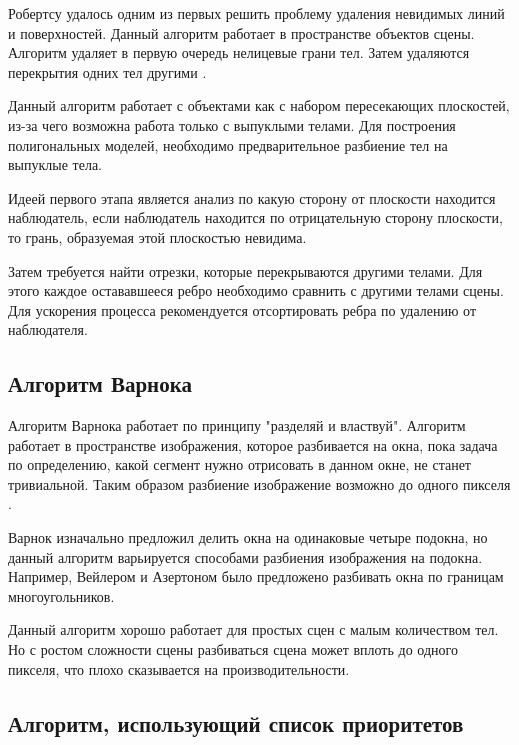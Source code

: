 Робертсу удалось одним из первых решить проблему удаления невидимых линий и поверхностей. Данный алгоритм работает в пространстве объектов сцены. Алгоритм удаляет в первую очередь нелицевые грани тел. Затем удаляются перекрытия одних тел другими  \cite{Rogers89}.

\par
Данный алгоритм работает с объектами как с набором пересекающих плоскостей, из-за чего возможна работа только с выпуклыми телами. Для построения полигональных моделей, необходимо предварительное разбиение тел на выпуклые тела.
\par
Идеей первого этапа является анализ по какую сторону от плоскости находится наблюдатель, если наблюдатель находится по отрицательную сторону плоскости, то грань, образуемая этой плоскостью невидима.
\par
Затем требуется найти отрезки, которые перекрываются другими телами. Для этого каждое остававшееся ребро необходимо сравнить с другими телами сцены. Для ускорения процесса рекомендуется отсортировать ребра по удалению от наблюдателя.

\subsection{Алгоритм Варнока}

Алгоритм Варнока работает по принципу "разделяй и властвуй".  Алгоритм работает в пространстве изображения, которое разбивается на окна, пока задача по определению, какой сегмент нужно отрисовать в данном окне, не станет тривиальной. Таким образом разбиение изображение возможно до одного пикселя  \cite{Rogers89}. 
\par
Варнок изначально предложил делить окна на одинаковые четыре подокна, но данный алгоритм варьируется способами разбиения изображения на подокна. Например, Вейлером и Азертоном было предложено разбивать окна по границам многоугольников.
\par
Данный алгоритм хорошо работает для простых сцен с малым количеством тел. Но с ростом сложности сцены разбиваться сцена может вплоть до одного пикселя, что плохо сказывается на производительности.

\subsection{Алгоритм, использующий список приоритетов}

